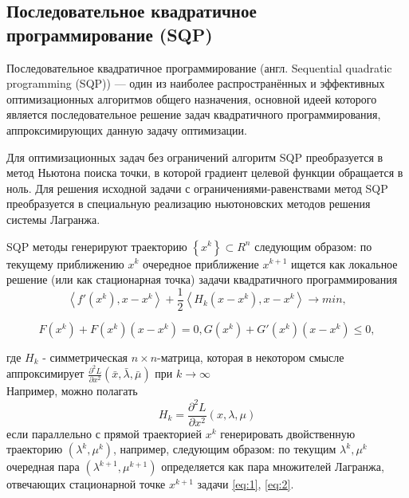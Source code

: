 \documentclass[12pt,a4paper]{article}
\begin{document}
	\subsection{Последовательное квадратичное программирование (SQP)}	
	Последовательное квадратичное программирование (англ. Sequential quadratic\\ programming (SQP)) — один из наиболее распространённых и эффективных оптимизационных алгоритмов общего назначения, основной идеей которого является последовательное решение задач квадратичного программирования, аппроксимирующих данную задачу оптимизации. 
	
	Для оптимизационных задач без ограничений алгоритм SQP преобразуется в метод Ньютона поиска точки, в которой градиент целевой функции обращается в ноль. Для решения исходной задачи с ограничениями-равенствами метод SQP преобразуется в специальную реализацию ньютоновских методов решения системы Лагранжа.
	
	SQP методы генерируют траекторию $\left\lbrace x^k \right\rbrace \subset R^n$ следующим образом: по текущему приближению $x^k$  очередное приближение $x^{k+1}$
	ищется как локальное решение
	(или как стационарная точка) задачи квадратичного программирования
	\begin{equation}\label{eq:1}
		\left\langle f'(x^k), x-x^k \right\rangle  + \frac{1}{2}\left\langle H_k(x-x^k), x-x^k \right\rangle \longrightarrow min,
	\end{equation}


	\begin{equation}\label{eq:2}
		F(x^k)+F(x^k)(x-x^k)=0, G(x^k)+G'(x^k)(x-x^k) \leq 0,
	\end{equation}

	где $H_k$ - симметрическая $n \times n$-матрица, которая в некотором смысле аппроксимирует $\frac{\partial^2 L}{\partial x^2}(\bar{x}, \bar{\lambda}, \bar{\mu})$ при $k\longrightarrow\infty$\\ Например, можно полагать
	\begin{equation}
	H_k = \frac{\partial^2 L}{\partial x^2}(x, \lambda, \mu)
	\end{equation}
	если параллельно с прямой траекторией ${x^k}$ генерировать двойственную траекторию ${(\lambda^k, \mu^k)}$,
	например, следующим образом: по текущим $\lambda^k, \mu^k$ очередная пара $(\lambda^{k+1}, \mu^{k+1})$ определяется как пара множителей Лагранжа, отвечающих стационарной точке $x^{k+1}$ задачи \ref{eq:1}, \ref{eq:2}. 
\end{document}
